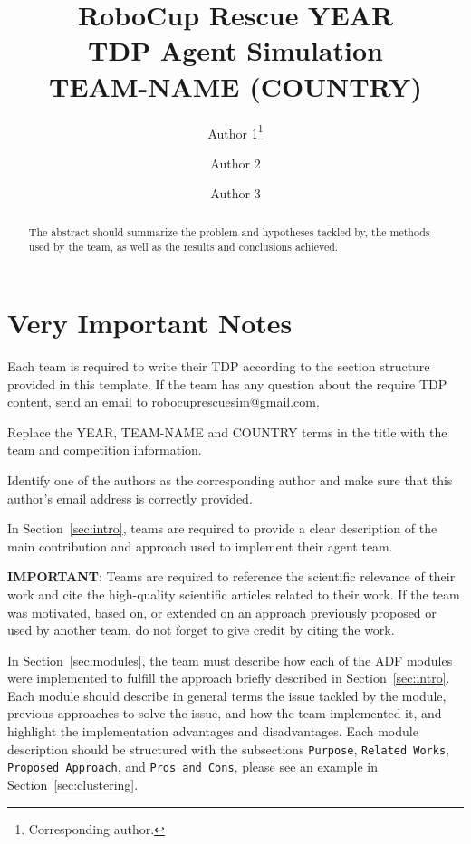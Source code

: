 \documentclass[runningheads,a4paper]{llncs}
\begin{document}
\title{RoboCup Rescue YEAR\\
       TDP Agent Simulation\\
       TEAM-NAME (COUNTRY)}
\author{Author 1\thanks{Corresponding author.} \and Author 2 \and Author 3}
\maketitle
\begin{abstract}
The abstract should summarize the problem and hypotheses tackled by, the methods used by the team, as well as the results and conclusions achieved.
\end{abstract}

\section*{Very Important Notes}
Each team is required to write their TDP according to the section structure provided in this template. If the team has any question about the require TDP content, send an email to \href{mailto:robocuprescuesim@gmail.com}{robocuprescuesim@gmail.com}.

Replace the YEAR, TEAM-NAME and COUNTRY terms in the title with the team and competition information.

Identify one of the authors as the corresponding author and make sure that this author's email address is correctly provided.

In Section~\ref{sec:intro}, teams are required to provide a clear description of the main contribution and approach used to implement their agent team.

\textbf{IMPORTANT}: Teams are required to reference the scientific relevance of their work and cite the high-quality scientific articles related to their work. If the team was motivated, based on, or extended on an approach previously proposed or used by another team, do not forget to give credit by citing the work.

In Section~\ref{sec:modules}, the team must describe how each of the ADF modules were implemented to fulfill the approach briefly described in Section~\ref{sec:intro}. Each module should describe in general terms the issue tackled by the module, previous approaches to solve the issue, and how the team implemented it, and highlight the implementation advantages and disadvantages. Each module description should be structured with the subsections \texttt{Purpose}, \texttt{Related Works}, \texttt{Proposed Approach}, and \texttt{Pros and Cons}, please see an example in Section~\ref{sec:clustering}.
\end{document}
